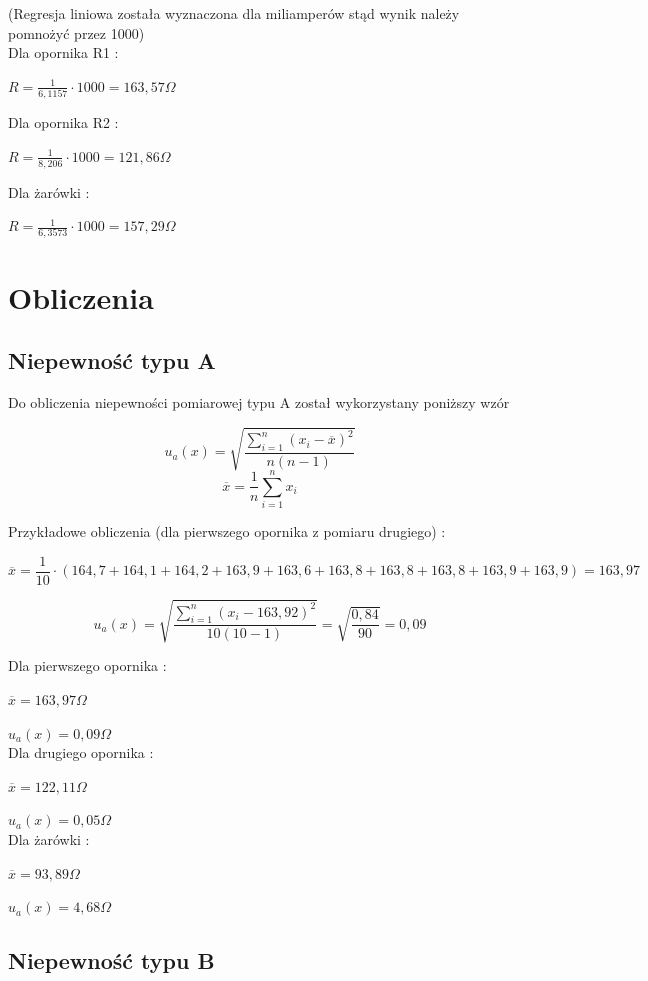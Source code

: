 \documentclass[12pt]{article}
\begin{document}
(Regresja liniowa została wyznaczona dla miliamperów stąd wynik należy pomnożyć przez 1000)\\

Dla opornika R1 : 

$ R = \frac{1}{6,1157} \cdot 1000 = 163,57 \Omega $

Dla opornika R2 :

$ R = \frac{1}{8,206} \cdot 1000 = 121,86 \Omega $

Dla żarówki : 

$ R = \frac{1}{6,3573} \cdot 1000 = 157,29 \Omega $

\pagebreak

\section{Obliczenia}
\subsection{Niepewność typu A}

Do obliczenia niepewności pomiarowej typu A został wykorzystany poniższy wzór

$$ u_a(x) = \sqrt{\frac{\sum\limits_{i=1}^{n}(x_i - \overline{x})^2}{n(n - 1)}} $$
$$ \overline{x} = \frac{1}{n}\sum\limits_{i = 1}^{n}x_i $$

Przykładowe obliczenia (dla pierwszego opornika z pomiaru drugiego) : 

$$ \overline{x} = \frac{1}{10} \cdot (164,7 + 164,1 + 164,2 + 163,9 + 163,6 + 163,8 + 163,8 
+ 163,8 + 163,9 + 163,9 ) = 163,97 $$

$$ u_a(x) = \sqrt{\frac{\sum\limits_{i=1}^{n}(x_i - 163,92)^2}{10(10 - 1)}}
= \sqrt{\frac{0,84}{90}} = 0,09 $$

Dla pierwszego opornika : 

$ \overline{x} = 163,97\Omega $

$ u_a(x) = 0,09\Omega $\\

Dla drugiego opornika : 

$ \overline{x} = 122,11\Omega $

$ u_a(x) = 0,05\Omega $\\

Dla żarówki : 

$ \overline{x} = 93,89\Omega $

$ u_a(x) = 4,68\Omega $

\subsection{Niepewność typu B}
\end{document}
